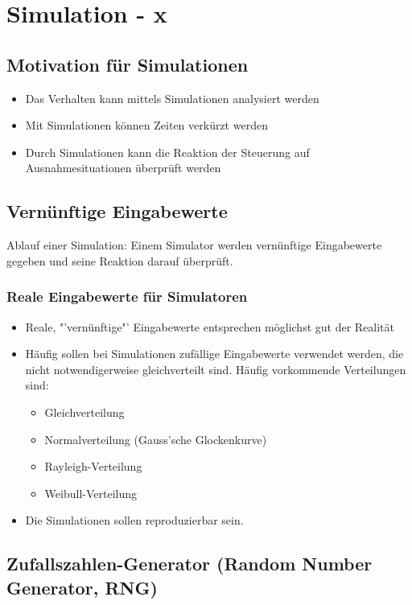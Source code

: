 \section{Simulation - x}

\subsection{Motivation für Simulationen}
\begin{itemize}
	\item Das Verhalten kann mittels Simulationen analysiert werden
	\item Mit Simulationen können Zeiten verkürzt werden
	\item Durch Simulationen kann die Reaktion der Steuerung auf Ausnahmesituationen überprüft werden
\end{itemize}

\subsection{Vernünftige Eingabewerte}
Ablauf einer Simulation: Einem Simulator werden vernünftige Eingabewerte gegeben und seine Reaktion darauf überprüft.
\subsubsection{Reale Eingabewerte für Simulatoren}
\begin{itemize}
	\item Reale, "'vernünftige"' Eingabewerte entsprechen möglichst gut der Realität
	\item Häufig sollen bei Simulationen zufällige Eingabewerte verwendet werden, die nicht notwendigerweise gleichverteilt sind. Häufig vorkommende Verteilungen sind:
	  \begin{itemize}
	    \item Gleichverteilung
		\item Normalverteilung (Gauss'sche Glockenkurve)
		\item Rayleigh-Verteilung
		\item Weibull-Verteilung
	  \end{itemize}
	\item Die Simulationen sollen reproduzierbar sein.
\end{itemize}

\subsection{Zufallszahlen-Generator (Random Number Generator, RNG)}
